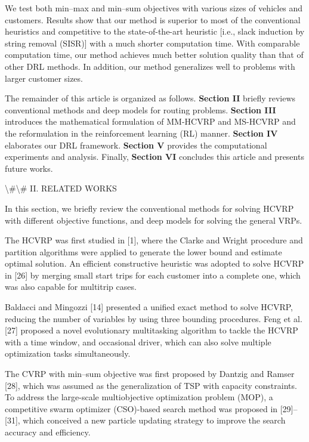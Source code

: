 \documentclass{article}
\begin{document}
	We test both min–max and min–sum objectives with various sizes of vehicles and customers. Results show that our method is superior to most of the conventional heuristics and competitive to the state-of-the-art heuristic [i.e., slack induction by string removal (SISR)] with a much shorter computation time. With comparable computation time, our method achieves much better solution quality than that of other DRL methods. In addition, our method generalizes well to problems with larger customer sizes.
	
	The remainder of this article is organized as follows.  
	\textbf{Section II} briefly reviews conventional methods and deep models for routing problems.  
	\textbf{Section III} introduces the mathematical formulation of MM-HCVRP and MS-HCVRP and the reformulation in the reinforcement learning (RL) manner.  
	\textbf{Section IV} elaborates our DRL framework.  
	\textbf{Section V} provides the computational experiments and analysis. Finally,  
	\textbf{Section VI} concludes this article and presents future works.
	
	\textbackslash{}#\textbackslash{}# II. RELATED WORKS
	
	In this section, we briefly review the conventional methods for solving HCVRP with different objective functions, and deep models for solving the general VRPs.
	
	The HCVRP was first studied in [1], where the Clarke and Wright procedure and partition algorithms were applied to generate the lower bound and estimate optimal solution. An efficient constructive heuristic was adopted to solve HCVRP in [26] by merging small start trips for each customer into a complete one, which was also capable for multitrip cases.
	
	Baldacci and Mingozzi [14] presented a unified exact method to solve HCVRP, reducing the number of variables by using three bounding procedures. Feng et al. [27] proposed a novel evolutionary multitasking algorithm to tackle the HCVRP with a time window, and occasional driver, which can also solve multiple optimization tasks simultaneously.
	
	The CVRP with min–sum objective was first proposed by Dantzig and Ramser [28], which was assumed as the generalization of TSP with capacity constraints. To address the large-scale multiobjective optimization problem (MOP), a competitive swarm optimizer (CSO)-based search method was proposed in [29]–[31], which conceived a new particle updating strategy to improve the search accuracy and efficiency.
	
\end{document}
